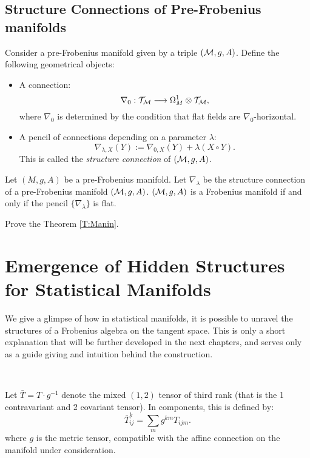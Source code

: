 \subsection{Structure Connections of Pre-Frobenius manifolds}
Consider a pre-Frobenius manifold given by a triple $(\mathcal{M}, g, A)$. Define the following geometrical objects:
\begin{itemize}
    \item A connection:
    \[
    \nabla_0: \mathcal{T}_{\mathcal{M}} \longrightarrow \Omega_M^1 \otimes \mathcal{T}_{\mathcal{M}},
    \]
    where $\nabla_0$ is determined by the condition that flat fields are $\nabla_0$-horizontal.
    \item A pencil of connections depending on a parameter $\lambda$:
    \[
    \nabla_{\lambda, X}(Y) := \nabla_{0, X}(Y) + \lambda (X \circ Y).
    \]
    This is called the \textit{structure connection} of $(\mathcal{M}, g, A)$.
\end{itemize}


\begin{theorem}[Manin]\label{T:Manin}
Let $(M, g, A)$ be a pre-Frobenius manifold. 
Let $\nabla_{\lambda}$ be the structure connection of a pre-Frobenius manifold $(\mathcal{M}, g, A)$. $(\mathcal{M}, g, A)$ is a Frobenius manifold if and only if the pencil $\{\nabla_\lambda\}$ is flat.
\end{theorem}

\begin{ex}\label{Ex:ManinProof}
Prove the Theorem \ref{T:Manin}.
\end{ex}

\section{Emergence of Hidden Structures for Statistical Manifolds}

We give a glimpse of how in statistical manifolds, it is possible to unravel the structures of a Frobenius algebra on the tangent space. This is only a short explanation that will be further developed in the next chapters, and serves only as a guide giving and intuition behind the construction.

\, 

Let $\bar{T} = T \cdot g^{-1}$ denote the mixed $(1, 2)$ tensor of third rank (that is the 1 contravariant and 2 covariant tensor). In components, this is defined by:
\[
\bar{T}_{ij}^k = \sum_m g^{km} T_{ijm}.
\]
where $g$ is the metric tensor, compatible with the affine connection on the manifold under consideration. 

